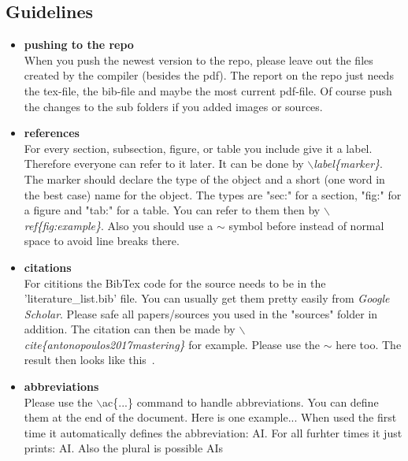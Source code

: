 \documentclass[12pt]{article}
\begin{document}
    \subsection{Guidelines} \label{sec:Guidelines}
        \begin{itemize}
        \item \textbf{pushing to the repo} \\
            When you push the newest version to the repo, please leave out the files created by the compiler (besides the pdf). The report on the repo just needs the tex-file, the bib-file and maybe the most current pdf-file. Of course push the changes to the sub folders if you added images or sources.

        \item \textbf{references} \\
            For every section, subsection, figure, or table you include give it a label. Therefore everyone can refer to it later. It can be done by \textit{$\backslash$label\{marker\}}. The marker should declare the type of the object and a short (one word in the best case) name for the object. The types are "sec:" for a section, "fig:" for a figure and "tab:" for a table. You can refer to them then by \textit{$\backslash$ref\{fig:example\}}. Also you should use a $\sim$ symbol before instead of normal space to avoid line breaks there.

        \item \textbf{citations} \\
            For cititions the BibTex code for the source needs to be in the 'literature\_list.bib' file. You can usually get them pretty easily from \textit{Google Scholar}. Please safe all papers/sources you used in the "sources" folder in addition. The citation can then be made by \textit{$\backslash$cite\{antonopoulos2017mastering\}} for example. Please use the $\sim$ here too. The result then looks like this~\cite{antonopoulos2017mastering}.


        \item \textbf{abbreviations} \\
            Please use the $\backslash$ac\{...\} command to handle abbreviations. You can define them at the end of the document. Here is one example... When used the first time it automatically defines the abbreviation: \ac{AI}. For all furhter times it just prints: \ac{AI}. Also the plural is possible \acp{AI}

        \end{itemize}
\end{document}
